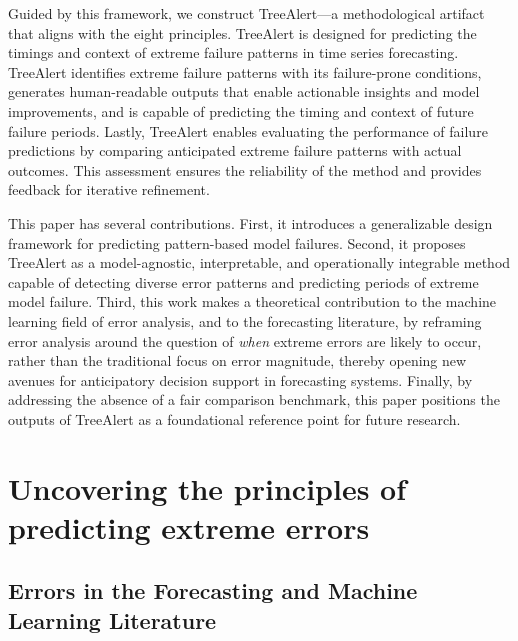 \documentclass[ijds,sglanonrev]{informs4}
\begin{document}
Guided by this framework, we construct TreeAlert---a methodological artifact that aligns with the eight principles. TreeAlert is designed for predicting the timings and context of extreme failure patterns in time series forecasting. TreeAlert identifies extreme failure patterns with its failure-prone conditions, generates human-readable outputs that enable actionable insights and model improvements, and is capable of predicting the timing and context of future failure periods. Lastly, TreeAlert enables evaluating the performance of failure predictions by comparing anticipated extreme failure patterns with actual outcomes. This assessment ensures the reliability of the method and provides feedback for iterative refinement.

This paper has several contributions. First, it introduces a generalizable design framework for predicting pattern-based model failures. Second, it proposes TreeAlert as a model-agnostic, interpretable, and operationally integrable method capable of detecting diverse error patterns and predicting periods of extreme model failure. Third, this work makes a theoretical contribution to the machine learning field of error analysis,  and to the forecasting literature, by reframing error analysis around the question of \emph{when} extreme errors are likely to occur, rather than the traditional focus on error magnitude, %
thereby opening new avenues for anticipatory decision support in forecasting systems. Finally, by addressing the absence of a fair comparison benchmark, this paper positions the outputs of TreeAlert as a foundational reference point for future research.

\section{Uncovering the principles of predicting extreme errors}

\subsection{Errors in the Forecasting and Machine Learning Literature}
\end{document}

